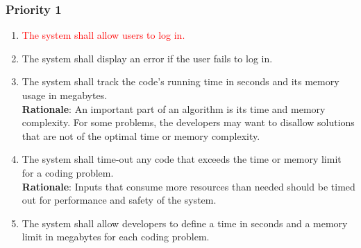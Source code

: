 \documentclass[12pt, titlepage]{article}
\begin{document}
\subsubsection{Priority 1}
\begin{enumerate}[label=FR.\arabic*, resume] 
    \item \textcolor{red}{The system shall allow users to log in.} \label{FR.14}
    \item The system shall display an error if the user fails to log in. \label{FR.15}
    \item The system shall track the code's running time in seconds and its memory usage in megabytes. \label{FR.16}\\
    \textbf{Rationale}: An important part of an algorithm is its time and memory complexity. For some problems, the developers may want to disallow solutions that are not of the optimal time or memory complexity.
    \item The system shall time-out any code that exceeds the time or memory limit for a coding problem. \label{FR.17} \\
     \textbf{Rationale}: Inputs that consume more resources than needed should be timed out for performance and safety of the system.  
    \item The system shall allow developers to define a time in seconds and a memory limit in megabytes for each coding problem. \label{FR.18}

\end{enumerate}
\end{document}
